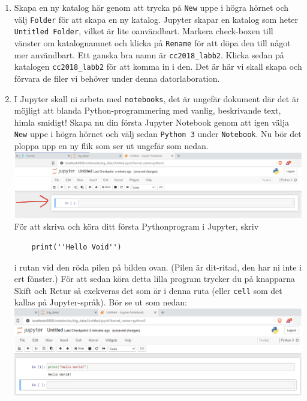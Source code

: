 \documentclass{article}
\begin{document}
\begin{enumerate}
  Jupyter körs som en server på din dator, så du har nu med framgång loggat in som användare på denna server. Det som syns på bilden ovan är de filer och kataloger som finns i din hemkatalog, alltså på min dator det som finns i \verb+C:\Users\perand+, där \verb+perand+ är mitt användarnamn.
\item Skapa en ny katalog här genom att trycka på \verb+New+ uppe i högra hörnet och välj \verb+Folder+ för att skapa en ny katalog. Jupyter skapar en katalog som heter \verb+Untitled Folder+, vilket är lite oanvändbart. Markera check-boxen till vänster om katalognamnet och klicka på \verb+Rename+ för att döpa den till något mer användbart. Ett ganska bra namn är \verb+cc2018_labb2+. Klicka sedan på katalogen \verb+cc2018_labb2+ för att komma in i den. Det är här vi skall skapa och förvara de filer vi behöver under denna datorlaboration.
\item I Jupyter skall ni arbeta med \verb+notebooks+, det är ungefär dokument där det är möjligt att blanda Python-programmering med vanlig, beskrivande text, himla smidigt! Skapa nu din första Jupyter Notebook genom att igen välja \verb+New+ uppe i högra hörnet och välj sedan \verb+Python 3+ under \verb+Notebook+. Nu bör det ploppa upp en ny flik som ser ut ungefär som nedan.	\\
  \includegraphics[width=\textwidth]{figures/anaconda3.png}\\
För att skriva och köra ditt första Pythonprogram i Jupyter, skriv
  \begin{verbatim}
    print(''Hello Void'')
    \end{verbatim}
i rutan vid den röda pilen på bilden ovan. (Pilen är dit-ritad, den har ni inte i ert fönster.) För att sedan köra detta lilla program trycker du på knapparna Skift och Retur så exekveras det som är i denna ruta (eller \verb+cell+ som det kallas på Jupyter-språk). Bör se ut som nedan:\\
  \includegraphics[width=\textwidth]{figures/anaconda4.png}

\end{enumerate}
\end{document}
